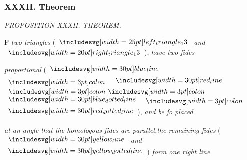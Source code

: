 \documentclass[11pt,preview]{standalone}
\begin{document}
\subsubsection{XXXII. Theorem}

\begin{minipage}[t]{0.43\textwidth}
    \vspace{20pt}
    
\end{minipage}%
\hfill
\begin{minipage}[t]{0.54\textwidth}
    \begin{center}
        \textit{PROPOSITION XXXII. THEOREM.}\label{book6pr32} \\
    \end{center}

    \hfill

    \begin{center}
        \raggedright \lettrine[lines=3, loversize=1, nindent=0pt]{}{}F \textit{two triangles} (\hspace{-1ex}$\img{left_triangle_13}$ \textit{and}\\ $\img[0][0][20]{right_triangle_13}$\hspace{-1ex}), \textit{have two ſides}
    \end{center}
    \raggedright \textit{proportional} (\hspace{-1ex}$\blueline$ $\bcolon$ $\redline$ $\bbcolon$ $\dottedblueline$ $\bcolon$ $\dottedredline$\hspace{-1ex}), \textit{and be ſo placed}
\end{minipage}
\raggedright \textit{at an angle that the homologous ſides are parallel,the remaining ſides} (\hspace{-1ex}$\yellowline$ \textit{and} $\dottedyellowline$\hspace{-1ex}) \textit{form one right line}.

\hfill
\end{document}
